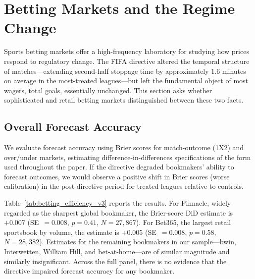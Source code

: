 \documentclass[12pt]{article}
\begin{document}
\section{Betting Markets and the Regime Change}
\label{sec:betting}

Sports betting markets offer a high-frequency laboratory for studying how
prices respond to regulatory change. The FIFA directive altered the temporal
structure of matches---extending second-half stoppage time by approximately
1.6 minutes on average in the most-treated leagues---but left the fundamental
object of most wagers, total goals, essentially unchanged. This section asks
whether sophisticated and retail betting markets distinguished between these
two facts.

\subsection{Overall Forecast Accuracy}
\label{subsec:brier}

We evaluate forecast accuracy using Brier scores for match-outcome (1X2)
and over/under markets, estimating difference-in-differences specifications
of the form used throughout the paper. If the directive degraded
bookmakers' ability to forecast outcomes, we would observe a positive shift
in Brier scores (worse calibration) in the post-directive period for
treated leagues relative to controls.

Table~\ref{tab:betting_efficiency_v3} reports the results. For Pinnacle, widely regarded
as the sharpest global bookmaker, the Brier-score DiD estimate is $+0.007$
(SE~$= 0.008$, $p = 0.41$, $N = 27{,}867$). For Bet365, the
largest retail sportsbook by volume, the estimate is $+0.005$
(SE~$= 0.008$, $p = 0.58$, $N = 28{,}382$). Estimates for the
remaining bookmakers in our sample---bwin, Interwetten, William Hill,
and bet-at-home---are of similar magnitude and similarly insignificant.
Across the full panel, there is no evidence that the directive impaired
forecast accuracy for any bookmaker.


\end{document}

